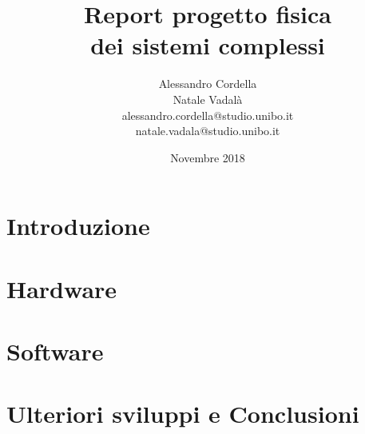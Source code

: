 \documentclass[11pt]{article}
\begin{document}
	\title{Report progetto fisica \\dei sistemi complessi\large}
	
	\author{Alessandro Cordella\large \\Natale Vadalà\\alessandro.cordella@studio.unibo.it\\natale.vadala@studio.unibo.it}
	\date{Novembre 2018}
	\maketitle
	\newpage
	\tableofcontents
	\newpage
\section{Introduzione}
\section{Hardware}
\section{Software}
\section{Ulteriori sviluppi e Conclusioni}	
%
%
\end{document}
